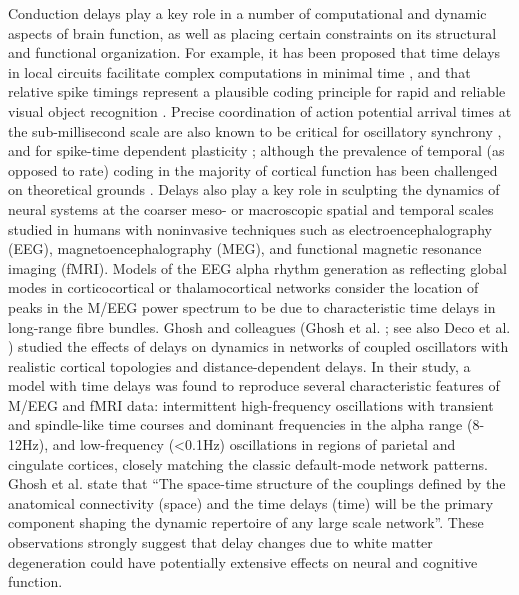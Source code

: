 Conduction delays play a key role in a number of computational and dynamic aspects of brain function, as well as placing certain constraints on its structural and functional organization. For example, it has been proposed that time delays in local circuits facilitate complex computations in minimal time \cite{izhikevich2006polychronization}, and that relative spike timings represent a plausible coding principle for rapid and reliable visual object recognition \cite{vanrullen2002surfing}. Precise coordination of action potential arrival times at the sub-millisecond scale are also known to be critical for oscillatory synchrony \cite{fries2005a}, and for spike-time dependent plasticity 
; although the prevalence of temporal (as opposed to rate) coding in the majority of cortical function has been challenged on theoretical grounds \cite{shadlen1998the}. Delays also play a key role in sculpting the dynamics of neural systems at the coarser meso- or macroscopic spatial and temporal scales studied in humans with noninvasive techniques such as electroencephalography (EEG), magnetoencephalography (MEG), and functional magnetic resonance imaging (fMRI). Models of the EEG alpha rhythm generation as reflecting global modes in corticocortical \cite{nunez2006electric}  or thalamocortical \cite{robinson2003neurophysical} networks consider the location of peaks in the M/EEG power spectrum to be due to characteristic time delays in long-range fibre bundles. Ghosh and colleagues (Ghosh et al. ; see also Deco et al. \citeyear{deco2009key}) studied the effects of delays on dynamics in networks of coupled oscillators with realistic cortical topologies and distance-dependent delays. In their study, a model with time delays was found to reproduce several characteristic features of M/EEG and fMRI data: intermittent high-frequency oscillations with transient and spindle-like time courses and dominant frequencies in the alpha range (8-12Hz), and low-frequency (<0.1Hz) oscillations in regions of parietal and cingulate cortices, closely matching the classic default-mode network patterns.  Ghosh et al. state that “The space-time structure of the couplings defined by the anatomical connectivity (space) and the time delays (time) will be the primary component shaping
the dynamic repertoire of any large scale network”. These observations strongly suggest that delay changes due to white matter degeneration could have potentially extensive effects on neural and cognitive function. 

